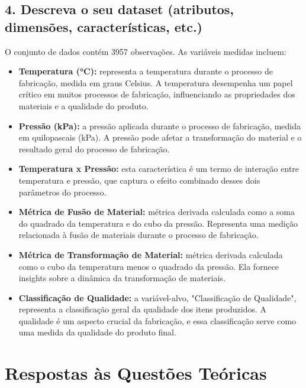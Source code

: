 \documentclass[12pt]{article}
\begin{document}
\subsection*{4. Descreva o seu dataset (atributos, dimensões, características, etc.)}
O conjunto de dados contém 3957 observações. As variáveis medidas incluem:

\begin{itemize}

\item \textbf{Temperatura (°C):} representa a temperatura durante o processo de fabricação, medida em graus Celsius. A temperatura desempenha um papel crítico em muitos processos de fabricação, influenciando as propriedades dos materiais e a qualidade do produto.

\item \textbf{Pressão (kPa):} a pressão aplicada durante o processo de fabricação, medida em quilopascais (kPa). A pressão pode afetar a transformação do material e o resultado geral do processo de fabricação.

\item \textbf{Temperatura x Pressão:} esta característica é um termo de interação entre temperatura e pressão, que captura o efeito combinado desses dois parâmetros do processo.

\item \textbf{Métrica de Fusão de Material:} métrica derivada calculada como a soma do quadrado da temperatura e do cubo da pressão. Representa uma medição relacionada à fusão de materiais durante o processo de fabricação.

\item \textbf{Métrica de Transformação de Material:} métrica derivada calculada como o cubo da temperatura menos o quadrado da pressão. Ela fornece insights sobre a dinâmica da transformação de materiais.

\item \textbf{Classificação de Qualidade:} a variável-alvo, "Classificação de Qualidade", representa a classificação geral da qualidade dos itens produzidos. A qualidade é um aspecto crucial da fabricação, e essa classificação serve como uma medida da qualidade do produto final.

\end{itemize}

\section{Respostas às Questões Teóricas}
\end{document}
